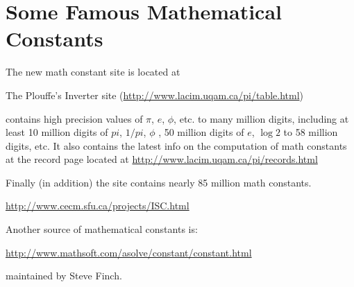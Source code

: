 \section{Some Famous Mathematical Constants}

The new math constant site is located at

The Plouffe's Inverter site
(\url{http://www.lacim.uqam.ca/pi/table.html})

contains high precision values of $\pi$, $e$, $\phi$, etc.  to many
million digits, including at least 10 million digits of $pi$, $1/pi$,
$\phi$ , 50 million digits of $e$, $\log 2$ to 58 million digits,
etc. It also contains the latest info on the computation of math
constants at the record page located at
\url{http://www.lacim.uqam.ca/pi/records.html}

Finally (in addition) the site contains nearly 85 million math
constants.

\url{http://www.cecm.sfu.ca/projects/ISC.html}


Another source of mathematical constants is:

\url{http://www.mathsoft.com/asolve/constant/constant.html}

maintained by Steve Finch.
